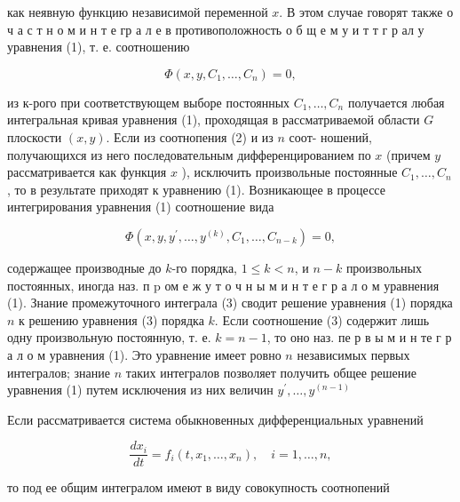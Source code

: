 \documentclass[10pt]{article}
\begin{document}
как неявную функцию независимой переменной $x$. В этом случае говорят также о ч а с т н о м и н т е гр а л е в противоположность о б щ е м у и т т г р ал у уравнения (1), т. е. соотношению



\[

\Phi\left(x, y, C_{1}, \ldots, C_{n}\right)=0,

\]



из к-рого при соответствующем выборе постоянных $C_{1}, \ldots, C_{n}$ получается любая интегральная кривая уравнения (1), проходящая в рассматриваемой области $G$ плоскости $(x, y)$. Если из соотнопения (2) и из $n$ соот- ношений, получающихся из него последовательным дифференцированием по $x$ (причем $y$ рассматривается как функция $x$ ), исключить произвольные постоянные $C_{1}, \ldots, C_{n}$, то в результате приходят к уравнению (1). Возникающее в процессе интегрирования уравнения (1) соотношение вида



\[

\Phi\left(x, y, y^{\prime}, \ldots, y^{(k)}, C_{1}, \ldots, C_{n-k}\right)=0,

\]



содержащее производные до $k$-го порядка, $1 \leqslant k<n$, и $n-k$ произвольных постоянных, иногда наз. п $\mathrm{p}$ ом е ж у т о ч н ы м и н т е г р а л о м уравнения (1). Знание промежуточного интеграла (3) сводит решение уравнения (1) порядка $n$ к решению уравнения (3) порядка $k$. Если соотношение (3) содержит лишь одну произвольную постоянную, т. е. $k=n-1$, то оно наз. пе р в ы м и н те г р а л о м уравнения (1). Это уравнение имеет ровно $n$ независимых первых интегралов; знание $n$ таких интегралов позволяет получить общее решение уравнения (1) путем исключения из них величин $y^{\prime}, \ldots, y^{(n-1)}$



Если рассматривается система обыкновенных дифференциальных уравнений



\[

\frac{d x_{i}}{d t}=f_{i}\left(t, x_{1}, \ldots, x_{n}\right), \quad i=1, \ldots, n,

\]



то под ее общим интегралом имеют в виду совокупность соотнопений
\end{document}
